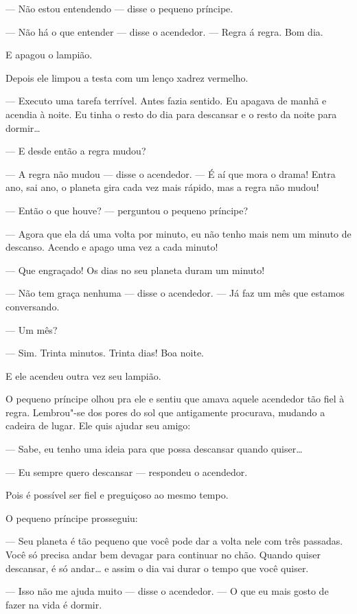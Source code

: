 \begin{Parallel}[p]{}{}
{--- Não estou entendendo --- disse o pequeno príncipe.

--- Não há o que entender --- disse o acendedor. --- Regra á regra. Bom dia.

E apagou o lampião.

Depois ele limpou a testa com um lenço xadrez vermelho.

--- Executo uma tarefa terrível. Antes fazia sentido. Eu apagava de manhã
e acendia à noite. Eu tinha o resto do dia para descansar e o resto da
noite para dormir\ldots{}

--- E desde então a regra mudou?

--- A regra não mudou --- disse o acendedor. --- É aí que mora o drama!
Entra ano, sai ano, o planeta gira cada vez mais rápido, mas a regra não
mudou!

--- Então o que houve? --- perguntou o pequeno príncipe?

--- Agora que ela dá uma volta por minuto, eu não tenho mais nem um minuto
de descanso. Acendo e apago uma vez a cada minuto!

--- Que engraçado! Os dias no seu planeta duram um minuto!

--- Não tem graça nenhuma --- disse o acendedor. --- Já faz um mês que
estamos conversando.

--- Um mês?

--- Sim. Trinta minutos. Trinta dias! Boa noite.

E ele acendeu outra vez seu lampião.

O pequeno príncipe olhou pra ele e sentiu que amava aquele acendedor tão
fiel à regra. Lembrou"-se dos pores do sol que antigamente procurava,
mudando a cadeira de lugar. Ele quis ajudar seu amigo:

--- Sabe, eu tenho uma ideia para que possa descansar quando quiser\ldots{}

--- Eu sempre quero descansar --- respondeu o acendedor.

Pois é possível ser fiel e preguiçoso ao mesmo tempo.

O pequeno príncipe prosseguiu:

--- Seu planeta é tão pequeno que você pode dar a volta nele com três
passadas. Você só precisa andar bem devagar para continuar no chão.
Quando quiser descansar, é só andar\ldots{} e assim o dia vai durar o tempo
que você quiser.

--- Isso não me ajuda muito --- disse o acendedor. --- O que eu mais gosto
de fazer na vida é dormir.

}
\end{Parallel}
